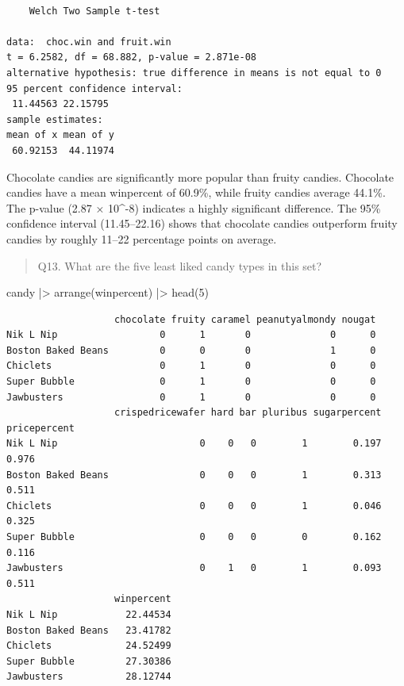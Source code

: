 \documentclass[
  letterpaper,
  DIV=11,
  numbers=noendperiod]{scrartcl}
\newenvironment{Shaded}{\begin{snugshade}}{\end{snugshade}}
\newcommand{\DecValTok}[1]{\textcolor[rgb]{0.68,0.00,0.00}{#1}}
\newcommand{\FunctionTok}[1]{\textcolor[rgb]{0.28,0.35,0.67}{#1}}
\newcommand{\NormalTok}[1]{\textcolor[rgb]{0.00,0.23,0.31}{#1}}
\newcommand{\SpecialCharTok}[1]{\textcolor[rgb]{0.37,0.37,0.37}{#1}}
\begin{document}
\begin{verbatim}

    Welch Two Sample t-test

data:  choc.win and fruit.win
t = 6.2582, df = 68.882, p-value = 2.871e-08
alternative hypothesis: true difference in means is not equal to 0
95 percent confidence interval:
 11.44563 22.15795
sample estimates:
mean of x mean of y 
 60.92153  44.11974 
\end{verbatim}

Chocolate candies are significantly more popular than fruity candies.
Chocolate candies have a mean winpercent of 60.9\%, while fruity candies
average 44.1\%. The p-value (2.87 × 10\^{}-8) indicates a highly
significant difference. The 95\% confidence interval (11.45--22.16)
shows that chocolate candies outperform fruity candies by roughly 11--22
percentage points on average.

\begin{quote}
Q13. What are the five least liked candy types in this set?
\end{quote}

\begin{Shaded}
\begin{Highlighting}[]
\NormalTok{candy }\SpecialCharTok{|\textgreater{}}
  \FunctionTok{arrange}\NormalTok{(winpercent) }\SpecialCharTok{|\textgreater{}}
  \FunctionTok{head}\NormalTok{(}\DecValTok{5}\NormalTok{)}
\end{Highlighting}
\end{Shaded}

\begin{verbatim}
                   chocolate fruity caramel peanutyalmondy nougat
Nik L Nip                  0      1       0              0      0
Boston Baked Beans         0      0       0              1      0
Chiclets                   0      1       0              0      0
Super Bubble               0      1       0              0      0
Jawbusters                 0      1       0              0      0
                   crispedricewafer hard bar pluribus sugarpercent pricepercent
Nik L Nip                         0    0   0        1        0.197        0.976
Boston Baked Beans                0    0   0        1        0.313        0.511
Chiclets                          0    0   0        1        0.046        0.325
Super Bubble                      0    0   0        0        0.162        0.116
Jawbusters                        0    1   0        1        0.093        0.511
                   winpercent
Nik L Nip            22.44534
Boston Baked Beans   23.41782
Chiclets             24.52499
Super Bubble         27.30386
Jawbusters           28.12744
\end{verbatim}
\end{document}
